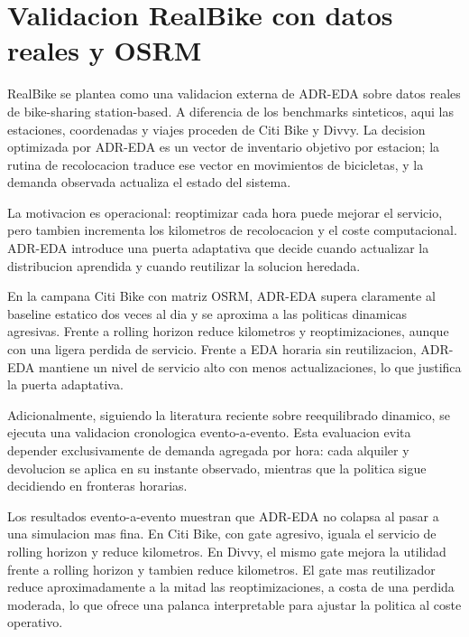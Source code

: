 \section{Validacion RealBike con datos reales y OSRM}
\label{sec:realbike-final}

RealBike se plantea como una validacion externa de ADR-EDA sobre datos reales de bike-sharing station-based. A diferencia de los benchmarks sinteticos, aqui las estaciones, coordenadas y viajes proceden de Citi Bike y Divvy. La decision optimizada por ADR-EDA es un vector de inventario objetivo por estacion; la rutina de recolocacion traduce ese vector en movimientos de bicicletas, y la demanda observada actualiza el estado del sistema.

La motivacion es operacional: reoptimizar cada hora puede mejorar el servicio, pero tambien incrementa los kilometros de recolocacion y el coste computacional. ADR-EDA introduce una puerta adaptativa que decide cuando actualizar la distribucion aprendida y cuando reutilizar la solucion heredada.





En la campana Citi Bike con matriz OSRM, ADR-EDA supera claramente al baseline estatico dos veces al dia y se aproxima a las politicas dinamicas agresivas. Frente a rolling horizon reduce kilometros y reoptimizaciones, aunque con una ligera perdida de servicio. Frente a EDA horaria sin reutilizacion, ADR-EDA mantiene un nivel de servicio alto con menos actualizaciones, lo que justifica la puerta adaptativa.



Adicionalmente, siguiendo la literatura reciente sobre reequilibrado dinamico, se ejecuta una validacion cronologica evento-a-evento. Esta evaluacion evita depender exclusivamente de demanda agregada por hora: cada alquiler y devolucion se aplica en su instante observado, mientras que la politica sigue decidiendo en fronteras horarias.



Los resultados evento-a-evento muestran que ADR-EDA no colapsa al pasar a una simulacion mas fina. En Citi Bike, con gate agresivo, iguala el servicio de rolling horizon y reduce kilometros. En Divvy, el mismo gate mejora la utilidad frente a rolling horizon y tambien reduce kilometros. El gate mas reutilizador reduce aproximadamente a la mitad las reoptimizaciones, a costa de una perdida moderada, lo que ofrece una palanca interpretable para ajustar la politica al coste operativo.

